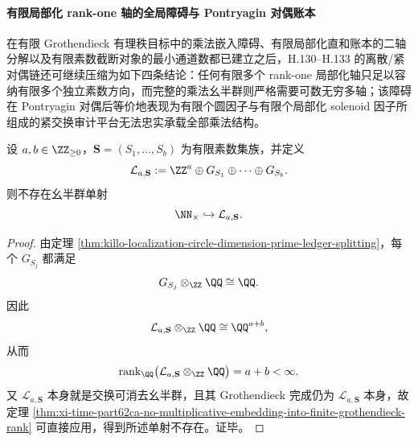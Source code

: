\paragraph{有限局部化 rank-one 轴的全局障碍与 Pontryagin 对偶账本}
在有限 Grothendieck 有理秩目标中的乘法嵌入障碍、有限局部化直和账本的二轴分解以及有限素数截断对象的最小通道数都已建立之后，H.130--H.133 的离散/紧对偶链还可继续压缩为如下四条结论：任何有限多个 rank-one 局部化轴只足以容纳有限多个独立素数方向，而完整的乘法幺半群则严格需要可数无穷多轴；该障碍在 Pontryagin 对偶后等价地表现为有限个圆因子与有限个局部化 solenoid 因子所组成的紧交换审计平台无法忠实承载全部乘法结构。

\begin{theorem}\label{thm:xi-time-part62debb-finite-localization-axes-no-full-multiplicative-host}
设 \(a,b\in \ZZ_{\ge 0}\)，\(\mathbf S=(S_1,\dots,S_b)\) 为有限素数集族，并定义
\[
\mathcal L_{a,\mathbf S}
:=
\ZZ^a\oplus G_{S_1}\oplus\cdots\oplus G_{S_b}.
\]
则不存在幺半群单射
\[
\NN_{\times}\hookrightarrow \mathcal L_{a,\mathbf S}.
\]
\end{theorem}
\begin{proof}
由定理 \ref{thm:killo-localization-circle-dimension-prime-ledger-splitting}，每个 \(G_{S_j}\) 都满足
\[
G_{S_j}\otimes_{\ZZ}\QQ\cong \QQ.
\]
因此
\[
\mathcal L_{a,\mathbf S}\otimes_{\ZZ}\QQ
\cong
\QQ^{a+b},
\]
从而
\[
\operatorname{rank}_{\QQ}
\bigl(\mathcal L_{a,\mathbf S}\otimes_{\ZZ}\QQ\bigr)=a+b<\infty.
\]
又 \(\mathcal L_{a,\mathbf S}\) 本身就是交换可消去幺半群，且其 Grothendieck 完成仍为 \(\mathcal L_{a,\mathbf S}\) 本身，故定理
\ref{thm:xi-time-part62ca-no-multiplicative-embedding-into-finite-grothendieck-rank}
可直接应用，得到所述单射不存在。证毕。
\end{proof}

